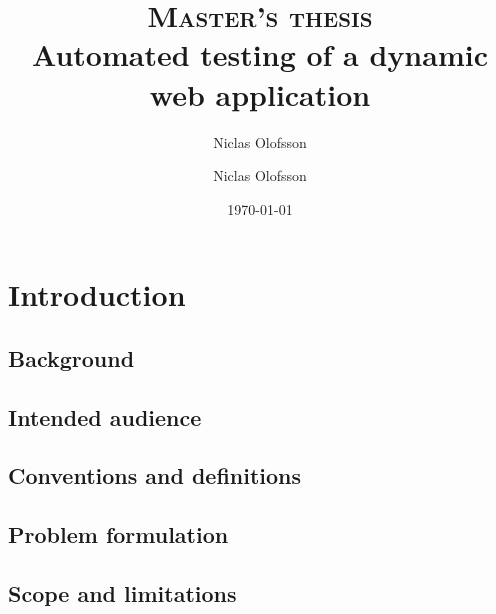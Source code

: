 \documentclass[a4paper]{report}
\author{Niclas Olofsson}
\title{\textsc{Master's thesis}\\
\Huge\textbf{Automated testing of a dynamic web application}}
\author{Niclas Olofsson}
\date{\today}
\begin{document}
\renewcommand{\lstlistingname}{Code listing}

\maketitle
\newpage

\begin{abstract}

\end{abstract}

\renewcommand{\abstractname}{Acknowledgments}

\begin{abstract}

\end{abstract}


\setcounter{tocdepth}{4}
\tableofcontents
\thispagestyle{empty}
\newpage

\setcounter{page}{1}

\chapter{Introduction}

  \section{Background}
  \label{sec:background}
  

  \section{Intended audience}
  

  \section{Conventions and definitions}
  

  \section{Problem formulation}
  

  \section{Scope and limitations}
  
\end{document}
